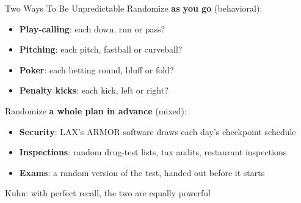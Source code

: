 
\begin{frame}{Two Ways To Be Unpredictable}
Randomize \textbf{as you go} (behavioral):
\begin{itemize}
    \item \textbf{Play-calling}: each down, run or pass?
    \item \textbf{Pitching}: each pitch, fastball or curveball?
    \item \textbf{Poker}: each betting round, bluff or fold?
    \item \textbf{Penalty kicks}: each kick, left or right?
\end{itemize}
\bsk
Randomize \textbf{a whole plan in advance} (mixed):
\begin{itemize}
    \item \textbf{Security}: LAX's ARMOR software draws each day's checkpoint schedule
    \item \textbf{Inspections}: random drug-test lists, tax audits, restaurant inspections
    \item \textbf{Exams}: a random version of the test, handed out before it starts
\end{itemize}
\bsk
Kuhn: with perfect recall, the two are equally powerful
\vfill
\vspace{-0.2in}
\end{frame}

